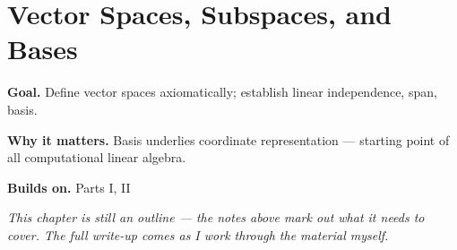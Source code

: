 \chapter{Vector Spaces, Subspaces, and Bases}
\label{ch:03-linear-algebra-01}

\begin{chapterintro}
\textbf{Goal.} Define vector spaces axiomatically; establish linear independence, span, basis.

\textbf{Why it matters.} Basis underlies coordinate representation — starting point of all computational linear algebra.

\textbf{Builds on.} Parts I, II
\end{chapterintro}

\textit{This chapter is still an outline --- the notes above mark out what it needs to cover. The full write-up comes as I work through the material myself.}
